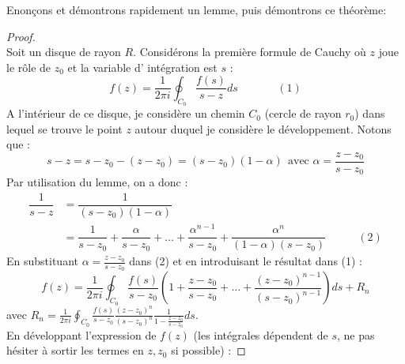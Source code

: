 	Enonçons et démontrons rapidement un lemme, puis démontrons ce théorème:\\
	
	
	\begin{proof}\ \\
	Soit un disque de rayon $R$. Considérons la première formule de Cauchy où $z$ joue le rôle 
	de $z_0$ et la variable d'	intégration est $s$ :
	\begin{equation}
	f(z) = \frac{1}{2\pi i}\oint_{C_0} \frac{f(s)}{s-z}ds\ \ \ \ \ \ \  \ \ \ \ \ \ \ \ \ (1)
	\end{equation}
	A l'intérieur de ce disque, je considère un chemin $C_0$ (cercle de rayon $r_0$) dans lequel
	 se trouve le point $z$ autour duquel je considère le développement. Notons que :
	\begin{equation}
	s-z = s-z_0-(z-z_0) = (s-z_0)(1-\alpha)\ \ \text{avec } \alpha = \frac{z-z_0}{s-z_0}
	\end{equation}
	Par utilisation du lemme, on a donc :
	\begin{equation}
	\begin{array}{ll}
	\dfrac{1}{s-z} &= \dfrac{1}{(s-z_0)(1-\alpha)}\\
	 &= \dfrac{1}{s-z_0}+\dfrac{\alpha}{s-z_0}+\dots+\dfrac{\alpha^{n-1}}{s-z_0}+\dfrac{\alpha^n}{
	 (1-\alpha)(s-z_0)} \ \ \ \ \ \ \ \ \ \ \ \ \ (2)
	\end{array}
	\end{equation}
	En substituant $\alpha = \frac{z-z_0}{s-z_0}$ dans (2) et en introduisant le résultat dans
	(1) :
	\begin{equation}
	f(z) = \frac{1}{2\pi i}\oint_{C_0} \frac{f(s)}{s-z_0}\left(1 + \dfrac{z-z_0}{s-z_0} + \dots +
	\dfrac{(z-z_0)^{n-1}}{(s-z_0)^{n-1}}\right)ds + R_n
	\end{equation}
	avec $R_n = \frac{1}{2\pi i}\oint_{C_0} \frac{f(s)}{s-z_0}\frac{(z-z_0)^n}{(s-z_0)^n}\frac{
	1}{1-\frac{z-z_0}{s-z_0}}ds$.\\
	En développant l'expression de $f(z)$ (les intégrales dépendent de $s$, ne pas hésiter à 
	sortir les termes en $z, z_0$ si possible) :

\end{proof}
